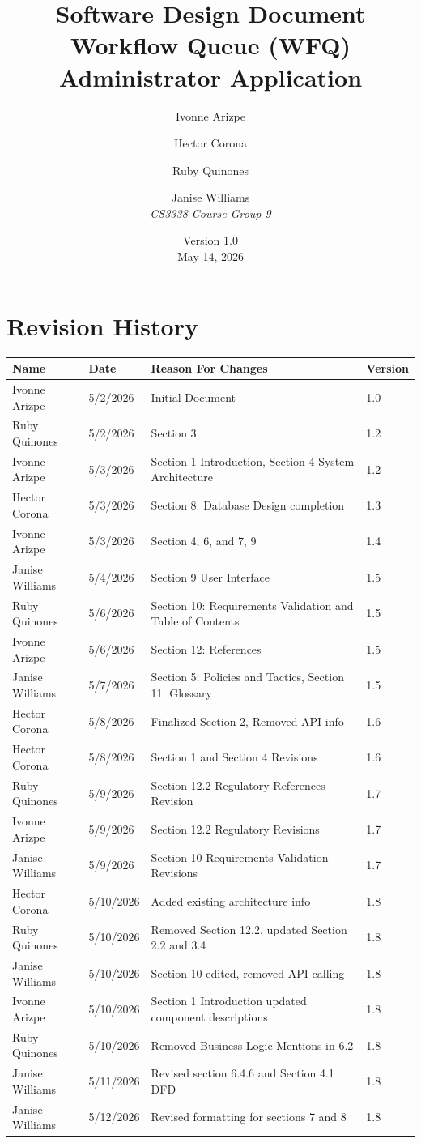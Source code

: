 \documentclass[12pt]{article}
\title{Software Design Document\\
\large Workflow Queue (WFQ) Administrator Application}
\author{Ivonne Arizpe \and Hector Corona \and Ruby Quinones \and Janise Williams\\[0.5em]
\textit{CS3338 Course Group 9}}
\date{Version 1.0 \\ May 14, 2026}
\begin{document}
 
\maketitle
\newpage
\tableofcontents
\newpage
 
\section*{Revision History}
\begin{center}
\begin{tabular}{llll}
\toprule
Name & Date & Reason For Changes & Version \\
\midrule
Ivonne Arizpe & 5/2/2026 & Initial Document & 1.0 \\
Ruby Quinones & 5/2/2026 & Section 3 & 1.2 \\
Ivonne Arizpe & 5/3/2026 & Section 1 Introduction, Section 4 System Architecture & 1.2 \\
Hector Corona & 5/3/2026 & Section 8: Database Design completion & 1.3 \\
Ivonne Arizpe & 5/3/2026 & Section 4, 6, and 7, 9 & 1.4 \\
Janise Williams & 5/4/2026 & Section 9 User Interface & 1.5 \\
Ruby Quinones & 5/6/2026 & Section 10: Requirements Validation and Table of Contents & 1.5 \\
Ivonne Arizpe & 5/6/2026 & Section 12: References & 1.5 \\
Janise Williams & 5/7/2026 & Section 5: Policies and Tactics, Section 11: Glossary & 1.5 \\
Hector Corona & 5/8/2026  & Finalized Section 2, Removed API info & 1.6 \\
Hector Corona & 5/8/2026  & Section 1 and Section 4 Revisions & 1.6 \\
Ruby Quinones & 5/9/2026  & Section 12.2 Regulatory References Revision & 1.7 \\
Ivonne Arizpe & 5/9/2026  & Section 12.2 Regulatory Revisions & 1.7 \\
Janise Williams & 5/9/2026  & Section 10 Requirements Validation Revisions & 1.7 \\
Hector Corona & 5/10/2026  & Added existing architecture info & 1.8 \\
Ruby Quinones & 5/10/2026 & Removed Section 12.2, updated Section 2.2 and 3.4  & 1.8 \\
Janise Williams & 5/10/2026 & Section 10 edited, removed API calling & 1.8 \\
Ivonne Arizpe & 5/10/2026 & Section 1 Introduction updated component descriptions & 1.8 \\
Ruby Quinones & 5/10/2026 & Removed Business Logic Mentions in 6.2 & 1.8 \\
Janise Williams & 5/11/2026 & Revised section 6.4.6 and Section 4.1 DFD & 1.8 \\
Janise Williams & 5/12/2026 & Revised formatting for sections 7 and 8 & 1.8 \\
\bottomrule
\end{tabular}
\end{center}
\newpage
 
\end{document}
